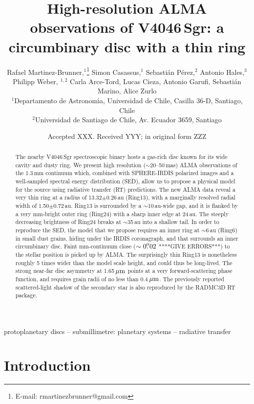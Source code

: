 \documentclass[letters,usenatbib,times]{mnras}
\title[High-resolution ALMA observations of V4046\,Sgr]{High-resolution ALMA observations of V4046\,Sgr: a circumbinary disc with a thin ring}
\author[R. Martinez Brunner et al.]{
Rafael Martinez-Brunner,$^{1}$\thanks{E-mail: rmartinezbrunner@gmail.com}
Simon Casassus,$^{1}$
Sebasti\'an P\'erez,$^{2}$
Antonio Hales,$^{3}$
Philipp Weber, $^{1,2}$ \newauthor
Carla Arce-Tord,
Lucas Cieza,
Antonio Garufi,
Sebasti\'an Marino,
Alice Zurlo
\\
$^{1}$Departamento de Astronom\'{\i}a, Universidad de Chile, Casilla 36-D, Santiago, Chile\\
$^{2}$Universidad de Santiago de Chile, Av. Ecuador 3659, Santiago\\
}
\date{Accepted XXX. Received YYY; in original form ZZZ}
\begin{document}
\label{firstpage}
\pagerange{\pageref{firstpage}--\pageref{lastpage}}
\maketitle

\begin{abstract}
  The nearby V4046\,Sgr spectroscopic binary hosts a gas-rich disc known for its wide cavity and dusty ring.  We present high resolution ($\sim$20--50\,mas) ALMA observations of the 1.3\,mm  continuum which, combined with SPHERE-IRDIS polarized images and a well-sampled spectral energy distribution (SED), allow us to propose a physical model for the source using radiative transfer (RT) predictions. The new ALMA data reveal a very thin ring at a radius of 13.32$\pm$0.26\,au (Ring13), with a marginally resolved radial width of 1.50$\pm$0.72\,au. Ring13 is surrounded by a $\sim$10\,au-wide gap, and it is flanked by a very mm-bright outer ring (Ring24) with a sharp inner edge at 24\,au. The steeply decreasing brightness of Ring24 breaks at $\sim$35\,au into a shallow tail. In order to reproduce the SED, the model that we propose requires an inner ring at $\sim$6\,au (Ring6) in small dust grains, hiding under the IRDIS coronagraph, and that surrounds an inner circumbinary disc. Faint mm-continuum close ($\sim0\hbox{$.\!\!^{\prime\prime}$}02 $ ****GIVE ERRORS***) to the stellar position is picked up by ALMA. The surprisingly thin Ring13 is nonetheless roughly 5 times wider than the model scale height, and could thus be long-lived. The strong near-far disc asymmetry at 1.65\,$\hbox{$\mu$m}$ points at a very forward-scattering phase function, and requires grain radii of no less than 0.4\,$\hbox{$\mu$m}$. The previously reported scattered-light shadow of the secondary star is also reproduced by the RADMC3D RT package. 
\end{abstract}

\begin{keywords}
 protoplanetary discs -- submillimetre: planetary systems -- radiative transfer
\end{keywords}



\section{Introduction} \label{sec:Introduction}
\end{document}
